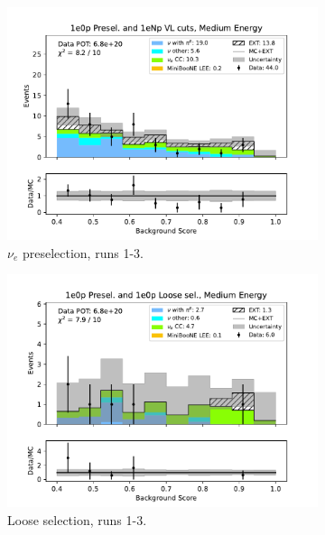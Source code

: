 \begin{figure}[H]
    \centering
    \begin{subfigure}{0.33\linewidth}
        \includegraphics[width=\linewidth]{technote/Sidebands/Figures/NearSideband/near_sideband_bkg_score_run123_ZP_ZP_MEDIUM_ENERGY.pdf}
        \caption{$\nu_e$ preselection, runs 1-3.}
    \end{subfigure}%
    \begin{subfigure}{0.33\linewidth}
        \includegraphics[width=\linewidth]{technote/Sidebands/Figures/NearSideband/near_sideband_bkg_score_run123_ZP_ZPLOOSESEL_MEDIUM_ENERGY.pdf}
        \caption{Loose selection, runs 1-3.}
    \end{subfigure}%
    \begin{subfigure}{0.33\linewidth}

\end{subfigure}
\end{figure}
